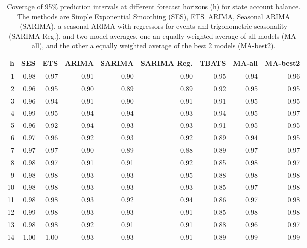 \documentclass{article}
\begin{document}
\begin{table}[ht]
\centering
\begin{tabular}{rrrrrrrrr}
  \hline
h & SES & ETS & ARIMA & SARIMA & SARIMA Reg. & TBATS & MA-all & MA-best2 \\ 
  \hline
1 & 0.98 & 0.97 & 0.91 & 0.90 & 0.90 & 0.95 & 0.94 & 0.96 \\ 
  2 & 0.96 & 0.95 & 0.90 & 0.89 & 0.89 & 0.92 & 0.95 & 0.95 \\ 
  3 & 0.96 & 0.94 & 0.91 & 0.90 & 0.91 & 0.91 & 0.95 & 0.95 \\ 
  4 & 0.99 & 0.95 & 0.94 & 0.94 & 0.93 & 0.94 & 0.95 & 0.97 \\ 
  5 & 0.96 & 0.92 & 0.94 & 0.93 & 0.93 & 0.91 & 0.95 & 0.95 \\ 
  6 & 0.97 & 0.96 & 0.92 & 0.93 & 0.92 & 0.89 & 0.94 & 0.95 \\ 
  7 & 0.97 & 0.97 & 0.90 & 0.89 & 0.88 & 0.89 & 0.97 & 0.97 \\ 
  8 & 0.98 & 0.97 & 0.91 & 0.91 & 0.92 & 0.85 & 0.98 & 0.97 \\ 
  9 & 0.98 & 0.98 & 0.93 & 0.93 & 0.95 & 0.88 & 0.98 & 0.98 \\ 
  10 & 0.98 & 0.98 & 0.93 & 0.93 & 0.93 & 0.85 & 0.97 & 0.98 \\ 
  11 & 0.98 & 0.98 & 0.93 & 0.92 & 0.94 & 0.86 & 0.97 & 0.98 \\ 
  12 & 0.99 & 0.98 & 0.93 & 0.93 & 0.91 & 0.85 & 0.98 & 0.98 \\ 
  13 & 0.98 & 0.98 & 0.92 & 0.91 & 0.91 & 0.88 & 0.96 & 0.97 \\ 
  14 & 1.00 & 1.00 & 0.93 & 0.93 & 0.91 & 0.89 & 0.99 & 0.99 \\ 
   \hline
\end{tabular}
\caption{Coverage of 95\% prediction intervals at different forecast horizons (h) for state account balance. The methods are Simple Exponential Smoothing (SES), ETS, ARIMA, Seasonal ARIMA (SARIMA), a seasonal ARIMA with regressors for events and trigonometric seasonality (SARIMA Reg.), and two model averages, one an equally weighted average of all models (MA-all), and the other a equally weighted average of the best 2 models (MA-best2).} 
\label{tab:covsab}
\end{table}
\end{document}
